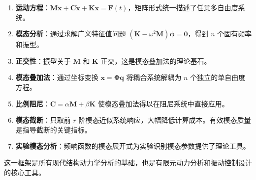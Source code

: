 \begin{enumerate}
\item \textbf{运动方程}：$\mathbf{M}\ddot{\mathbf{x}} + \mathbf{C}\dot{\mathbf{x}} + \mathbf{K}\mathbf{x} = \mathbf{F}(t)$，矩阵形式统一描述了任意多自由度系统。

\item \textbf{模态分析}：通过求解广义特征值问题 $(\mathbf{K} - \omega^2\mathbf{M})\bm{\phi} = \mathbf{0}$，得到 $n$ 个固有频率和振型。

\item \textbf{正交性}：振型关于 $\mathbf{M}$ 和 $\mathbf{K}$ 正交，这是模态叠加法的理论基石。

\item \textbf{模态叠加法}：通过坐标变换 $\mathbf{x} = \mathbf{\Phi}\mathbf{q}$ 将耦合系统解耦为 $n$ 个独立的单自由度方程。

\item \textbf{比例阻尼}：$\mathbf{C} = \alpha\mathbf{M} + \beta\mathbf{K}$ 使模态叠加法得以在阻尼系统中直接应用。

\item \textbf{模态截断}：只取前 $r$ 阶模态近似系统响应，大幅降低计算成本。有效模态质量是指导截断的关键指标。

\item \textbf{实验模态分析}：频响函数的模态展开式为实验识别模态参数提供了理论工具。
\end{enumerate}

这一框架是所有现代结构动力学分析的基础，也是有限元动力分析和振动控制设计的核心工具。

